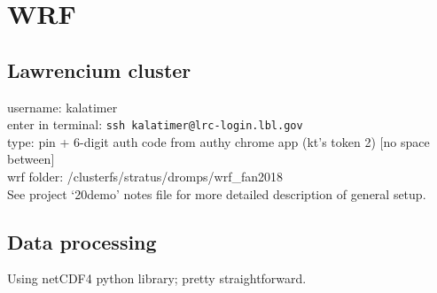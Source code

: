 \documentclass{article}
\begin{document}
\section{WRF}
\subsection{Lawrencium cluster}
username: kalatimer\\
enter in terminal: \texttt{ssh kalatimer@lrc-login.lbl.gov}\\
type: pin + 6-digit auth code from authy chrome app (kt's token 2) [no space between]\\
wrf folder: /clusterfs/stratus/dromps/wrf\_fan2018\\
See project `20demo' notes file for more detailed description of general setup.
\subsection{Data processing}
Using netCDF4 python library; pretty straightforward.
\end{document}
